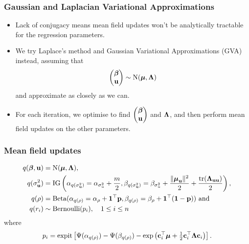 \documentclass{beamer}
\begin{document}
\begin{frame}
	\frametitle{Gaussian and Laplacian Variational Approximations}
	\begin{itemize}
		\item Lack of conjugacy means mean field updates won't be analytically tractable for the regression parameters.
		\item We try Laplace's method and Gaussian Variational Approximations (GVA) instead, assuming that
		      $$
		      \begin{pmatrix}
		      	{\boldsymbol\beta} \\
		      	{\bf u}    
		      \end{pmatrix}
		      \sim \text{N}({\boldsymbol \mu}, {\boldsymbol \Lambda})
		      $$
		      and approximate as closely as we can.
		\item For each iteration, we optimise to find
		      $\begin{pmatrix}
		      	{\boldsymbol\beta} \\
		      	{\bf u}    
		      \end{pmatrix}
		      $ and ${\boldsymbol \Lambda}$,
		      and then perform mean field updates on the other parameters.
	\end{itemize}
\end{frame}

\begin{frame}
	\frametitle{Mean field updates}
	\begin{align*}
		q({\boldsymbol \beta}, {\bf u})    & = \text{N}({\boldsymbol \mu}, {\boldsymbol \Lambda}),                                                                                                                                                                                 \\
		q(\sigma_{{\bf u}}^2) & = \text{IG}\left(\alpha_{q(\sigma_{{\bf u}}^2)} = \alpha_{\sigma_u^2} + \frac{m}{2}, \beta_{q(\sigma_{{\bf u}}^2)} = \beta_{\sigma_u^2} + \frac{\|{\boldsymbol \mu}_{\bf u}\|^2}{2} + \frac{\text{tr}({\boldsymbol \Lambda}_{{\bf u}{\bf u}})}{2}\right), \\
		q(\rho)           & = \text{Beta}(\alpha_{q(\rho)} = \alpha_\rho + {\bf 1}^\top {\bf p}, \beta_{q(\rho)} = \beta_\rho + {\bf 1}^\top({\bf 1} - {\bf p}))\text{ and}                                                                                  \\
		q(r_i)            & \sim \text{Bernoulli} (p_i), \ \ \ 1 \leq i \leq n                                                                                                                                                         
	\end{align*}
	where
	$$
	p_i = \text{expit} \left [\Psi{(\alpha_{q(\rho)})} - \Psi{(\beta_{q(\rho)})} - \exp{\left({\bf c}_i^\top {\boldsymbol\mu}+  \tfrac{1}{2} {\bf c}_i^\top  {\boldsymbol\Lambda}{\bf c}_i\right)} \right ].
	$$
\end{frame}
\end{document}
